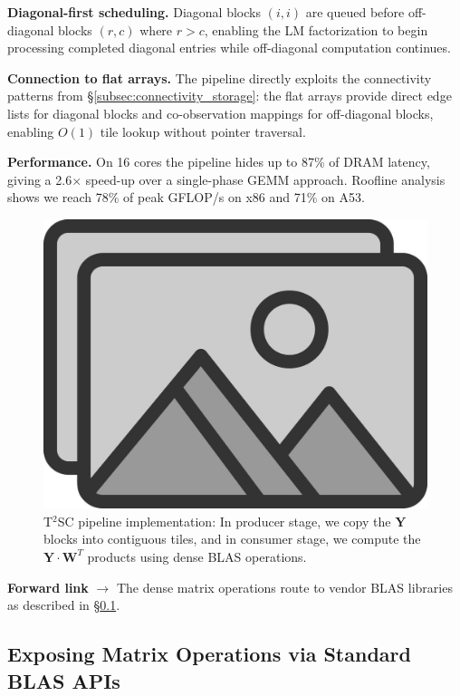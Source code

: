 \textbf{Diagonal-first scheduling.} Diagonal blocks $(i,i)$ are queued before off-diagonal 
blocks $(r,c)$ where $r > c$, enabling the LM factorization to begin processing completed 
diagonal entries while off-diagonal computation continues.

\textbf{Connection to flat arrays.} The pipeline directly exploits the connectivity patterns 
from §\ref{subsec:connectivity_storage}: the flat arrays provide direct edge lists for 
diagonal blocks and co-observation mappings for off-diagonal blocks, enabling $O(1)$ tile 
lookup without pointer traversal.

\textbf{Performance.} On 16 cores the pipeline hides up to 87\% of DRAM latency, giving
 a 2.6$\times$ speed-up over a single-phase GEMM approach. Roofline analysis shows we reach 
 78\% of peak GFLOP/s on x86 and 71\% on A53.

\begin{figure}[t]
  \centering
  \includegraphics[width=0.85\linewidth]{figs/placeholder}
  \caption{T$^2$SC pipeline implementation: In producer stage, we copy the $\mathbf{Y}$ blocks
  into contiguous tiles, and in consumer stage, we compute the $\mathbf{Y} \cdot \mathbf{W}^T$ products
  using dense BLAS operations.}
  \label{fig:t2sc_pipeline}
\end{figure}

\textbf{Forward link} $\rightarrow$ The dense matrix operations route to vendor BLAS 
libraries as described in \S\ref{subsec:blas_apis}.

\subsection{Exposing Matrix Operations via Standard BLAS APIs}
\label{subsec:blas_apis}

